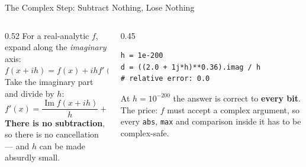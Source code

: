 \begin{frame}[fragile]{The Complex Step: Subtract Nothing, Lose Nothing}
\begin{columns}[T]
\begin{column}{0.52\textwidth}
\small
For a real-analytic $f$, expand along the \emph{imaginary} axis:
\[
  f(x+ih)=f(x)+ihf'(x)-\tfrac{h^{2}}{2}f''(x)+\dots
\]
Take the imaginary part and divide by $h$:
\[
  f'(x)=\frac{\operatorname{Im} f(x+ih)}{h}+O(h^{2}).
\]
\textbf{There is no subtraction}, so there is no cancellation --- and $h$ can be made absurdly small.
\end{column}
\begin{column}{0.45\textwidth}
\begin{lstlisting}
h = 1e-200
d = ((2.0 + 1j*h)**0.36).imag / h
# relative error: 0.0
\end{lstlisting}
\vspace{-1mm}
\begin{takeawaybox}\footnotesize
At $h=10^{-200}$ the answer is correct to \textbf{every bit}. The price: $f$ must accept a complex argument, so every \texttt{abs}, \texttt{max} and comparison inside it has to be complex-safe.
\end{takeawaybox}
\end{column}
\end{columns}
\vspace{1mm}
\end{frame}

